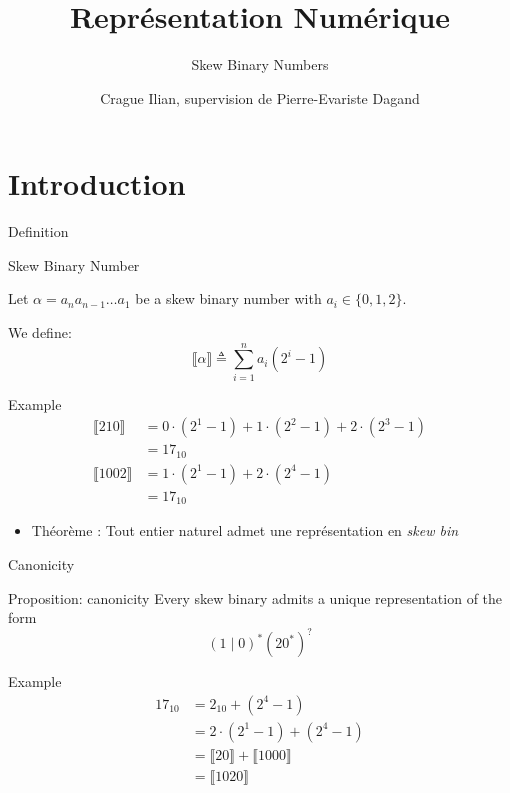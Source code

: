 \documentclass{beamer}
\title[Your Short Title]{Représentation Numérique}
\subtitle{Skew Binary Numbers}
\author{Crague Ilian, supervision de Pierre-Evariste Dagand}
\institute{IRIF}
\begin{document}
\begin{frame}
  \titlepage
\end{frame}


\section{Introduction}
\newcommand{\denote}[1]{\ensuremath{\llbracket #1 \rrbracket}}
\newcommand{\aSbin}[1][0]{\ensuremath{\alpha}}
\newcommand{\aDigit}[1][i]{\ensuremath{a_{#1}}}
\begin{frame}{Definition}

\begin{block}{Skew Binary Number}

  Let $ \aSbin = \aDigit[n] \aDigit[n-1] \ldots \aDigit[1]$ be a skew binary number with $\aDigit \in \{0, 1, 2\}$.
  
  We define:
  $$\denote{\aSbin} \triangleq \sum_{i = 1}^{n} \aDigit[i] (2^{i} - 1)$$
\end{block}


\begin{block}{Example}
\begin{align*}
    \denote{210} &= 0 \cdot (2^{1} - 1) + 1 \cdot (2^{2} - 1) + 2 \cdot (2^{3} - 1)\\
    &= 17_{10}\\
    \denote{1002} &= 1 \cdot (2^1 - 1) + 2 \cdot (2^4 - 1)\\
    &=17_{10}
\end{align*} 
\end{block}
\end{frame}


\begin{itemize}
\item Théorème : Tout entier naturel admet une représentation en \textit{skew bin}
\end{itemize}



\begin{frame}{Canonicity}
\begin{block}{Proposition: canonicity}
Every skew binary admits a unique representation of the form
$$(1 \mid 0)^* (20^*)^?$$
\end{block}

\begin{block}{Example}
\begin{align*}
    17_{10} &= 2_{10} + (2^4 - 1)\\
    &= 2 \cdot (2^1 - 1) + (2^4 - 1)\\
    &= \denote{20} + \denote{1000}\\
    &= \denote{1020}
\end{align*}  
\end{block}

\end{frame}
\end{document}
